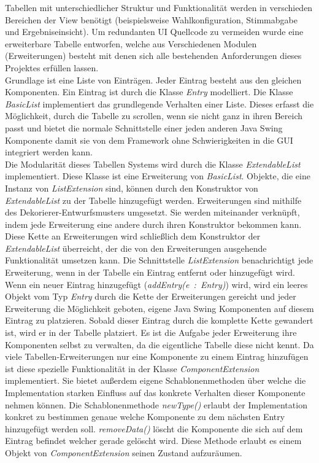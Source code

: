 \documentclass[parskip=full]{scrartcl}
\newcommand{\textitx}[1]{\mbox{\textit{#1}}}
\begin{document}
		Tabellen mit unterschiedlicher Struktur und Funktionalität werden in verschieden Bereichen der View benötigt (beispielsweise Wahlkonfiguration, Stimmabgabe und Ergebniseinsicht). Um redundanten UI Quellcode zu vermeiden wurde eine erweiterbare Tabelle entworfen, welche aus Verschiedenen Modulen (Erweiterungen) besteht mit denen sich alle bestehenden Anforderungen dieses Projektes erfüllen lassen.
		\\
		Grundlage ist eine Liste von Einträgen. Jeder Eintrag besteht aus den gleichen Komponenten. Ein Eintrag ist durch die Klasse \textitx{Entry} modelliert. Die Klasse \textitx{BasicList} implementiert das grundlegende Verhalten einer Liste. Dieses erfasst die Möglichkeit, durch die Tabelle zu scrollen, wenn sie nicht ganz in ihren Bereich passt und bietet die normale Schnittstelle einer jeden anderen Java Swing Komponente damit sie von dem Framework ohne Schwierigkeiten in die GUI integriert werden kann.
		\\
		Die Modularität dieses Tabellen Systems wird durch die Klasse \textitx{ExtendableList} implementiert. Diese Klasse ist eine Erweiterung von \textitx{BasicList}. Objekte, die eine Instanz von \textitx{ListExtension} sind, können durch den Konstruktor von \textitx{ExtendableList} zu der Tabelle hinzugefügt werden. Erweiterungen sind mithilfe des Dekorierer-Entwurfsmusters umgesetzt. Sie werden miteinander verknüpft, indem jede Erweiterung eine andere durch ihren Konstruktor bekommen kann. Diese Kette an Erweiterungen wird schließlich dem Konstruktor der \textitx{ExtendableList} überreicht, der die von den Erweiterungen ausgehende Funktionalität umsetzen kann. Die Schnittstelle \textitx{ListExtension} benachrichtigt jede Erweiterung, wenn in der Tabelle ein Eintrag entfernt oder hinzugefügt wird. Wenn ein neuer Eintrag hinzugefügt (\textitx{addEntry(e : Entry)}) wird, wird ein leeres Objekt vom Typ \textitx{Entry} durch die Kette der Erweiterungen gereicht und jeder Erweiterung die Möglichkeit geboten, eigene Java Swing Komponenten auf diesem Eintrag zu platzieren. Sobald dieser Eintrag durch die komplette Kette gewandert ist, wird er in der Tabelle platziert. Es ist die Aufgabe jeder Erweiterung ihre Komponenten selbst zu verwalten, da die eigentliche Tabelle diese nicht kennt. Da viele Tabellen-Erweiterungen nur eine Komponente zu einem Eintrag hinzufügen ist diese spezielle Funktionalität in der Klasse \textitx{ComponentExtension} implementiert. Sie bietet außerdem eigene Schablonenmethoden über welche die Implementation starken Einfluss auf das konkrete Verhalten dieser Komponente nehmen können. Die Schablonenmethode \textitx{newType()} erlaubt der Implementation konkret zu bestimmen genaue welche Komponente zu dem nächsten Entry hinzugefügt werden soll. \textitx{removeData()} löscht die Komponente die sich auf dem Eintrag befindet welcher gerade gelöscht wird. Diese Methode erlaubt es einem Objekt von \textitx{ComponentExtension} seinen Zustand aufzuräumen.
\end{document}
